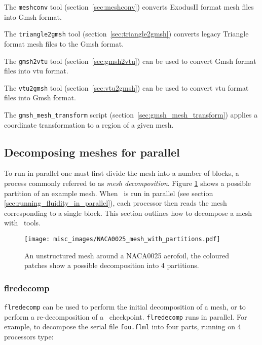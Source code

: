 The \lstinline[language = Bash]+meshconv+ tool (section~\ref{sec:meshconv}) converts ExodusII format mesh files into Gmsh format.

The \lstinline[language = Bash]+triangle2gmsh+ tool (section~\ref{sec:triangle2gmsh}) converts legacy Triangle format mesh files to the Gmsh format.

The \lstinline[language = Bash]+gmsh2vtu+ tool (section~\ref{sec:gmsh2vtu}) can be used to convert Gmsh format files into vtu format.

The \lstinline[language = Bash]+vtu2gmsh+ tool (section~\ref{sec:vtu2gmsh}) can be used to convert vtu format files into Gmsh format.

The \lstinline[language = Bash]+gmsh_mesh_transform+ script (section~\ref{sec:gmsh_mesh_transform}) applies a coordinate transformation to a region of a given mesh.



\subsection{Decomposing meshes for parallel}
\label{decomp_meshes_parallel}
To run in parallel one must first divide the mesh into a number of blocks, a process
commonly referred to as \emph{mesh decomposition}. Figure \ref{fig:NACA0025_mesh_with_partitions}
shows a possible partition of an example mesh. When \fluidity\ is run in parallel (see section
\ref{sec:running_fluidity_in_parallel}), each processor then reads the mesh corresponding to a
single block. This section outlines how to decompose a mesh with \fluidity\ tools.
\begin{figure}[htbp]
 \centering
  \texttt{[image: misc\_images/NACA0025\_mesh\_with\_partitions.pdf]}
  \caption{An unstructured mesh around a NACA0025 aerofoil, the coloured patches show a
           possible decomposition into 4 partitions.}
  \label{fig:NACA0025_mesh_with_partitions}
\end{figure}

\subsubsection{flredecomp}
\label{mesh!meshing tools!flredecomp}
\lstinline[language=bash]+flredecomp+ can be used to perform the initial decomposition of a mesh, or to perform a re-decomposition of a \fluidity\ checkpoint. \lstinline[language=bash]+flredecomp+ runs in parallel.
For example, to decompose the serial file \lstinline+foo.flml+
into four parts, running on 4 processors type:

